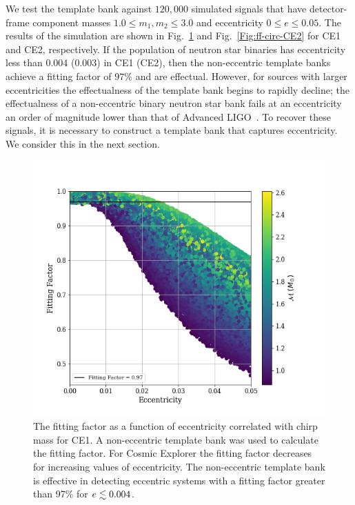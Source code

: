 We test the template bank against $120,000$ simulated signals that have detector-frame component masses $1.0 \leq m_1,m_2 \leq 3.0$ and eccentricity $0 \le e \le 0.05$. The results of the simulation are shown in Fig.~\ref{Fig:ff-circ-CE1} and Fig.~\ref{Fig:ff-circ-CE2} for CE1 and CE2, respectively. If the population of neutron star binaries has eccentricity less than 0.004 (0.003) in CE1 (CE2), then the non-eccentric template banks achieve a fitting factor of $97\%$ and are effectual. However, for sources with larger eccentricities the effectualness of the template bank begins to rapidly decline; the effectualness of a non-eccentric binary neutron star bank fails at an eccentricity an order of magnitude lower than that of Advanced LIGO~\cite{Brown:2009ng, Huerta:2013qb}. To recover these signals, it is necessary to construct a template bank that captures eccentricity. We consider this in the next section.
\begin{figure}
    \includegraphics[width=1.1\columnwidth]{Figures/3G-bns-search-prospects/non-eccen-ff-mchirp-CE1.png}
    \caption{The fitting factor as a function of eccentricity correlated with chirp mass for CE1. A non-eccentric template bank was used to calculate the fitting factor. For Cosmic Explorer the fitting factor decreases for increasing values of eccentricity. The non-eccentric template bank is effective in detecting eccentric systems with a fitting factor greater than 97\% for $e \lesssim 0.004$.}
\label{Fig:ff-circ-CE1}
\end{figure}
